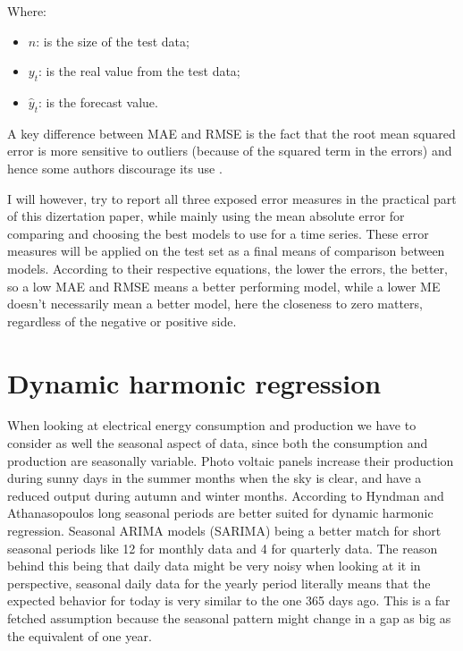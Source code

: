\documentclass[12pt,a4paper,titlepage]{report}
\begin{document}
Where:
\begin{itemize}
    \item $ n $: is the size of the test data;
    \item $ y_{t} $: is the real value from the test data;
    \item $ \hat{y}_{t} $: is the forecast value.
\end{itemize} 

A key difference between MAE and RMSE is the fact that the root mean squared error is more sensitive to outliers (because of the squared term in the errors) and hence some authors discourage its use \cite{armstrongevaluatingforecastingmethods}.

I will however, try to report all three exposed error measures in the practical part of this dizertation paper, while mainly using the mean absolute error for comparing and choosing the best models to use for a time series.
These error measures will be applied on the test set as a final means of comparison between models. According to their respective equations, the lower the errors, the better, so a low MAE and RMSE means a better performing model, while a lower ME doesn't necessarily mean a better model, here the closeness to zero matters, regardless of the negative or positive side.


\section{Dynamic harmonic regression} \label{dynamicharmonicregression}
When looking at electrical energy consumption and production we have to consider as well the seasonal aspect of data, since both the consumption and production are seasonally variable. Photo voltaic panels increase their production during sunny days in the summer months when the sky is clear, and have a reduced output during autumn and winter months.
According to Hyndman and Athanasopoulos \cite{fpp2dhr} long seasonal periods are better suited for dynamic harmonic regression. Seasonal ARIMA models (SARIMA) being a better match for short seasonal periods like 12 for monthly data and 4 for quarterly data.
The reason behind this being that daily data might be very noisy when looking at it in perspective, seasonal daily data for the yearly period literally means that the expected behavior for today is very similar to the one 365 days ago. This is a far fetched assumption because the seasonal pattern might change in a gap as big as the equivalent of one year.
\end{document}
